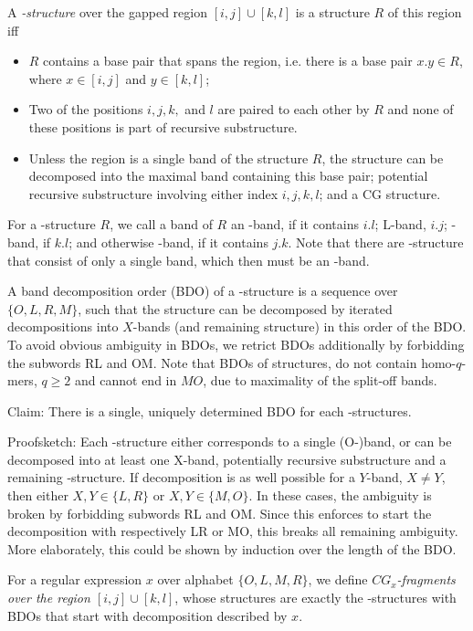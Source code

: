 \documentclass[11pt]{article} %
\newcommand{\Ob}{\text{O}}
\newcommand{\Rb}{\text{R}}
\newcommand{\Lb}{\text{L}}
\newcommand{\Mb}{\text{M}}
\begin{document}
A \emph{\CGR-structure} over the gapped region $[i,j]\cup[k,l]$ is a structure $R$ of this region iff
\begin{itemize}
  \item $R$ contains a base pair that spans the region, i.e. there is a base pair $x.y\in R$, where $x\in[i,j]$ and $y\in[k,l]$;
  \item Two of the positions $i,j,k,$ and $l$ are paired to each other by $R$ and
    none of these positions is part of recursive substructure.
  \item Unless the region is a single band of the structure $R$, the structure 
    can be decomposed into the maximal band containing this base pair;
    potential recursive substructure involving either index $i,j,k,l$; 
    and a CG structure.
\end{itemize}
For a \CGR-structure $R$, we call a band of $R$ an \Ob-band, if it contains $i.l$; $\Lb$-band, $i.j$; \Rb-band, if $k.l$; and otherwise \Mb-band, if it contains $j.k$. Note that there are \CGR-structure that consist of only a single band, which then must be an \Ob-band.

A band decomposition order (BDO) of a \CGR-structure is a sequence over $\{O,L,R,M\}$, such that the structure can be decomposed by iterated decompositions into $X$-bands (and remaining structure) in this order of the BDO.
To avoid obvious ambiguity in BDOs, we retrict BDOs additionally by forbidding the subwords RL and OM. Note that BDOs of structures, do not contain homo-$q$-mers, $q\geq 2$ and cannot end in $MO$, due to maximality of the split-off bands. 

Claim: There is a single, uniquely determined  BDO for each \CGR-structures.

Proofsketch: Each \CGR-structure either corresponds to a single (O-)band, or can be decomposed into at least one X-band, potentially recursive substructure and a remaining \CGR-structure. If decomposition is as well possible for a $Y$-band, $X\neq Y$, then either $X,Y\in\{L,R\}$ or $X,Y\in\{M,O\}$. In these cases, the ambiguity is broken by forbidding subwords RL and OM. Since this enforces to start the decomposition with respectively LR or MO, this breaks all remaining ambiguity. More elaborately, this could be shown by induction over the length of the BDO.

For a regular expression $x$ over alphabet $\{O,L,M,R\}$, we define \emph{$CG_x$-fragments over the region $[i,j]\cup[k,l]$}, whose structures are exactly the \CGR-structures with BDOs that start with decomposition described by $x$.
\end{document}
